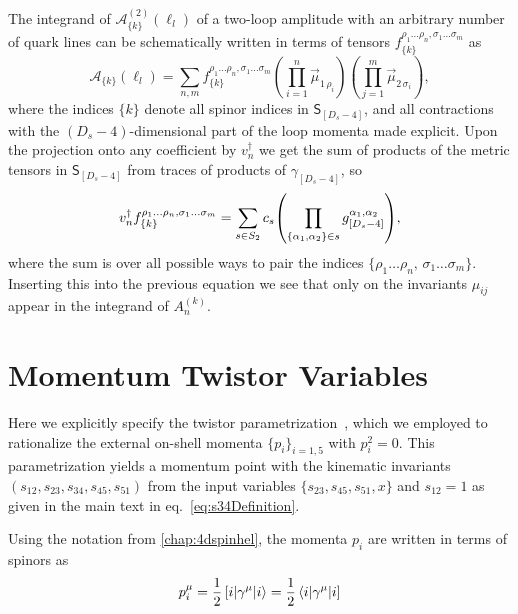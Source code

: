 The integrand of $\mathcal{A}^{(2)}_{\{k\}}(\ell_l)$ of a two-loop amplitude with an arbitrary
number of quark lines can be schematically written in terms of tensors $f^{\rho_1 \ldots \rho_n, \sigma_1\ldots \sigma_m}_{\{k\}}$ as
\begin{equation} 
  \mathcal{A}_{\{k\}}(\ell_l) = \sum_{n,m} f^{\rho_1 \ldots \rho_n, \sigma_1 \ldots \sigma_m}_{\{k\}}
  \left(\prod_{i=1}^n \vec{\mu}_{1 \, \rho_i}\right)
  \left(\prod_{j=1}^m \vec{\mu}_{2 \, \sigma_i}\right),
\end{equation}
where the indices $\{k\}$ denote all spinor indices in  $\mathsf{S}_{[D_s-4]}$,
and all contractions with the $(D_s-4)$-dimensional part of the loop momenta made explicit.
Upon the projection onto any coefficient by $v_n^\dagger$ we get the sum of products of the metric tensors in $\mathsf{S}_{[D_s-4]}$
from traces of products of $\gamma_{[D_s-4]}$, so 
\begin{equation}
  v_n^\dagger f^{\rho_1 \ldots \rho_n, \sigma_1 \ldots \sigma_m}_{\{k\}}  = \sum_{s\in S_2} c_s \qty(\prod_{\{\alpha_1,\alpha_2\}\in s} g^{\alpha_1,\alpha_2}_{[D_s-4]}),
\end{equation}
where the sum is over all possible ways to pair the indices $\{ \rho_1 \ldots \rho_n,\,\sigma_1 \ldots \sigma_m \}$.
Inserting this into the previous equation we see that only on the invariants $\mu_{ij}$ appear in the integrand of $A_n^{(k)}$.



\chapter{Momentum Twistor Variables}
\label{sec:twistors}

Here we explicitly specify the twistor parametrization~\cite{Hodges:2009hk}, which
we employed to rationalize the external on-shell momenta $\{p_i\}_{i=1,5}$ with
$p_i^2=0$. This parametrization yields a momentum point with the
kinematic invariants $(s_{12}, s_{23}, s_{34}, s_{45}, s_{51})$ from the
input variables $\{ s_{23}, s_{45}, s_{51}, x \}$ and $s_{12}=1$ 
as given in the main text in eq.~\eqref{eq:s34Definition}.

Using the notation from \cref{chap:4dspinhel}, the momenta $p_i$ are written in terms of spinors as
\begin{equation}
  p^\mu_i = \frac{1}{2}\sbraket(i,\gamma^\mu,i) = \frac{1}{2}\brasket(i,\gamma^\mu,i)
\end{equation}

